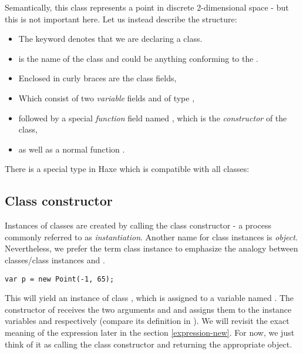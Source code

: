 
Semantically, this class represents a point in discrete 2-dimensional space - but this is not important here. Let us instead describe the structure:

\begin{itemize}
	\item The keyword  denotes that we are declaring a class.
	\item {} is the name of the class and could be anything conforming to the .
	\item Enclosed in curly braces \expr{$\left\{\right\}$} are the class fields,
	\item Which consist of two \emph{variable} fields  and  of type ,
	\item followed by a special \emph{function} field named , which is the \emph{constructor} of the class,
	\item as well as a normal function .
\end{itemize}
There is a special type in Haxe which is compatible with all classes:


\subsection{Class constructor}
\label{types-class-constructor}

Instances of classes are created by calling the class constructor - a process commonly referred to as \emph{instantiation}. Another name for class instances is \emph{object}. Nevertheless, we prefer the term class instance to emphasize the analogy between classes/class instances and . 

\begin{lstlisting}
var p = new Point(-1, 65);
\end{lstlisting}
This will yield an instance of class , which is assigned to a variable named . The constructor of  receives the two arguments  and  and assigns them to the instance variables  and  respectively (compare its definition in ). We will revisit the exact meaning of the  expression later in the section \ref{expression-new}. For now, we just think of it as calling the class constructor and returning the appropriate object.



